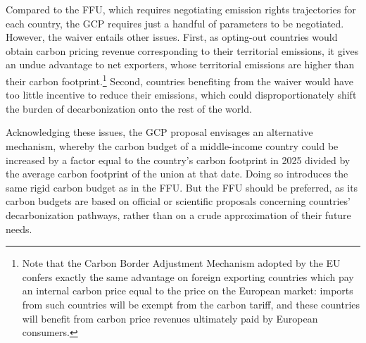 \documentclass[12pt,english]{article}
\begin{document}
Compared to the FFU, which requires negotiating emission rights trajectories for each country, the GCP requires just a handful of parameters to be negotiated. However, the waiver entails other issues. First, as opting-out countries would obtain carbon pricing revenue corresponding to their territorial emissions, it gives an undue advantage to net exporters, whose territorial emissions are higher than their carbon footprint.\footnote{Note that the Carbon Border Adjustment Mechanism adopted by the EU confers exactly the same advantage on foreign exporting
countries which pay an internal carbon price equal to the price on the European market: imports from such countries will be exempt from the carbon tariff, and these countries will benefit from carbon price revenues ultimately paid by European consumers.} Second, countries benefiting from the waiver would have too little incentive to reduce their emissions, which could disproportionately shift the burden of decarbonization onto the rest of the world. 

Acknowledging these issues, the GCP proposal envisages an alternative mechanism,\cite{fabre_global_2024} whereby the carbon budget of a middle-income country could be increased by a factor equal to the country's carbon footprint in 2025 divided by the average carbon footprint of the union at that date. Doing so introduces the same rigid carbon budget as in the FFU. But the FFU should be preferred, as its carbon budgets are based on official or scientific proposals concerning countries' decarbonization pathways, rather than on a crude approximation of their future needs.
\end{document}
